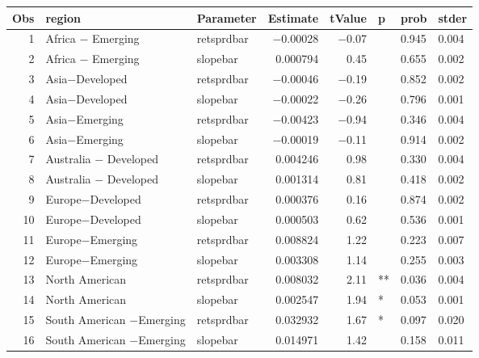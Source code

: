 

\begin{longtable}{|r|l|l|r|r|l|l|l|}\hline
   Obs &    region &    Parameter &    Estimate &    tValue &    p &    prob &    stder\\\hline
\endhead
   1 &    Africa $-$ Emerging &    retsprdbar &    $-$0.00028 &    $-$0.07 &      &    0.945 &    0.004\\\hline
   2 &    Africa $-$ Emerging &    slopebar &    0.000794 &    0.45 &      &    0.655 &    0.002\\\hline
   3 &    Asia$-$Developed &    retsprdbar &    $-$0.00046 &    $-$0.19 &      &    0.852 &    0.002\\\hline
   4 &    Asia$-$Developed &    slopebar &    $-$0.00022 &    $-$0.26 &      &    0.796 &    0.001\\\hline
   5 &    Asia$-$Emerging &    retsprdbar &    $-$0.00423 &    $-$0.94 &      &    0.346 &    0.004\\\hline
   6 &    Asia$-$Emerging &    slopebar &    $-$0.00019 &    $-$0.11 &      &    0.914 &    0.002\\\hline
   7 &    Australia $-$ Developed &    retsprdbar &    0.004246 &    0.98 &      &    0.330 &    0.004\\\hline
   8 &    Australia $-$ Developed &    slopebar &    0.001314 &    0.81 &      &    0.418 &    0.002\\\hline
   9 &    Europe$-$Developed &    retsprdbar &    0.000376 &    0.16 &      &    0.874 &    0.002\\\hline
   10 &    Europe$-$Developed &    slopebar &    0.000503 &    0.62 &      &    0.536 &    0.001\\\hline
   11 &    Europe$-$Emerging &    retsprdbar &    0.008824 &    1.22 &      &    0.223 &    0.007\\\hline
   12 &    Europe$-$Emerging &    slopebar &    0.003308 &    1.14 &      &    0.255 &    0.003\\\hline
   13 &    North American &    retsprdbar &    0.008032 &    2.11 &    ** &    0.036 &    0.004\\\hline
   14 &    North American &    slopebar &    0.002547 &    1.94 &    * &    0.053 &    0.001\\\hline
   15 &    South American $-$Emerging &    retsprdbar &    0.032932 &    1.67 &    * &    0.097 &    0.020\\\hline
   16 &    South American $-$Emerging &    slopebar &    0.014971 &    1.42 &      &    0.158 &    0.011\\\hline
\end{longtable}

